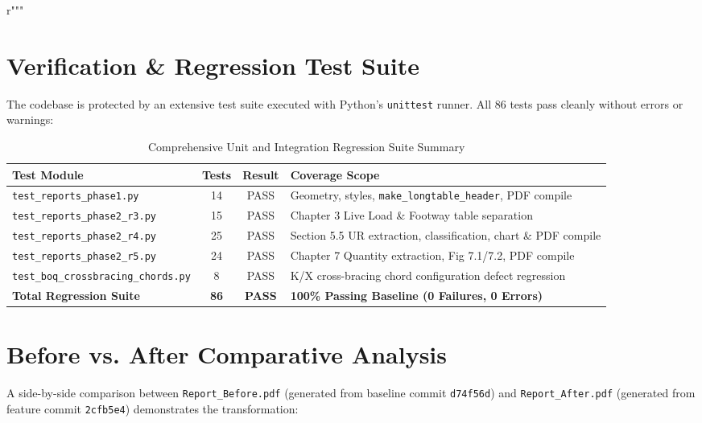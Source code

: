 r"""\documentclass[11pt,a4paper]{article}
\begin{document}
\section{Verification \& Regression Test Suite}

The codebase is protected by an extensive test suite executed with Python's \texttt{unittest} runner. All 86 tests pass cleanly without errors or warnings:

\begin{table}[h!]
\centering
\small
\begin{tabular}{|l|c|c|l|}
\hline
\textbf{Test Module} & \textbf{Tests} & \textbf{Result} & \textbf{Coverage Scope} \\
\hline
\texttt{test\_reports\_phase1.py} & 14 & PASS & Geometry, styles, \texttt{make\_longtable\_header}, PDF compile \\
\texttt{test\_reports\_phase2\_r3.py} & 15 & PASS & Chapter 3 Live Load \& Footway table separation \\
\texttt{test\_reports\_phase2\_r4.py} & 25 & PASS & Section 5.5 UR extraction, classification, chart \& PDF compile \\
\texttt{test\_reports\_phase2\_r5.py} & 24 & PASS & Chapter 7 Quantity extraction, Fig 7.1/7.2, PDF compile \\
\texttt{test\_boq\_crossbracing\_chords.py} & 8 & PASS & K/X cross-bracing chord configuration defect regression \\
\hline
\textbf{Total Regression Suite} & \textbf{86} & \textbf{PASS} & \textbf{100\% Passing Baseline (0 Failures, 0 Errors)} \\
\hline
\end{tabular}
\caption{Comprehensive Unit and Integration Regression Suite Summary}
\end{table}

\section{Before vs. After Comparative Analysis}

A side-by-side comparison between \texttt{Report\_Before.pdf} (generated from baseline commit \texttt{d74f56d}) and \texttt{Report\_After.pdf} (generated from feature commit \texttt{2cfb5e4}) demonstrates the transformation:
\end{document}
